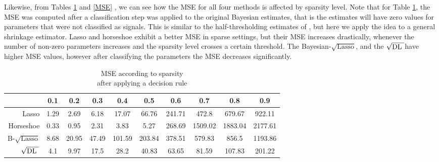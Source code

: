 \documentclass[10pt]{article}
\def\sql{$\sqrt{\text{Lasso}}$}
\def\sqdl{$\sqrt{\text{\rm{DL} }}$}
\begin{document}
Likewise, from Tables \ref{MSE_dec} and \ref{MSE} , we can see how the MSE for all four methods is affected by sparsity level. Note that for Table \ref{MSE_dec}, the MSE was computed after a classification step was applied to the original Bayesian estimates, that is the estimates will have zero values for parameters that were not classified as signals. This is similar to the half-thresholding estimates of \cite{tang2016bayesian}, but here we apply the idea to a general shrinkage estimator. Lasso and horseshoe exhibit a better MSE in sparse settings, but their MSE increases drastically, whenever the number of non-zero parameters increases and the sparsity level crosses a certain threshold. The Bayesian-\sql, and the \sqdl have higher MSE values, however after classifying the parameters the MSE decreases significantly. 



\begin{table}[h!]
\caption{MSE according to sparsity\\ after applying a decision rule}\label{MSE_dec}
\begin{center}
\footnotesize{
\begin{tabular}{c|c|c|c|c|c|c|c|c|c|}
\cline{2-10}
    & 0.1  &  0.2  &  0.3  &  0.4  &  0.5 &   0.6  &  0.7  &  0.8 &   0.9 	\\
\hline
\multicolumn{1}{|r|}{Lasso} & 1.29 &  2.69 &  6.18 &  17.07 & 66.76 &  241.71 & 472.8 &  679.67 &  922.11	\\
\hline
\multicolumn{1}{|r|}{Horseshoe} &   0.33 & 0.95 &  2.31 &  3.83 &   5.27 &   268.69 & 1509.02 & 1883.04 & 2177.61 \\
\hline
\multicolumn{1}{|r|}{B-\sql} & 8.68 & 20.95 & 47.49 & 101.59 & 203.84 & 378.51 & 579.83 &  856.5 &   1193.86 \\
\hline
\multicolumn{1}{|r|}{\sqdl} &4.1 &  9.97 &  17.5 &  28.2 &   40.83 &  63.65 &  81.59 &   107.83 &  201.22 \\
\hline
\end{tabular}}
\end{center}

\end{table}
\end{document}
